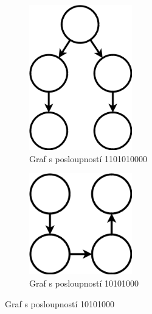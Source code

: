 \documentclass[../main.tex]{subfiles}
\begin{document}
\begin{figure}[H]
    \centering
    \begin{subfigure}[b]{0.49\textwidth}
        \centering
        \includegraphics*[width=0.49\textwidth]{images/tu3/1101010000.png}
        \caption*{Graf s posloupností 1101010000 }
    \end{subfigure}
    \hfill
    \begin{subfigure}[b]{0.49\textwidth}
        \centering
        \includegraphics*[width=0.49\textwidth]{images/tu3/10101000.png}
        \caption*{Graf s posloupností 10101000 }
    \end{subfigure}



\end{figure}
\end{document}
